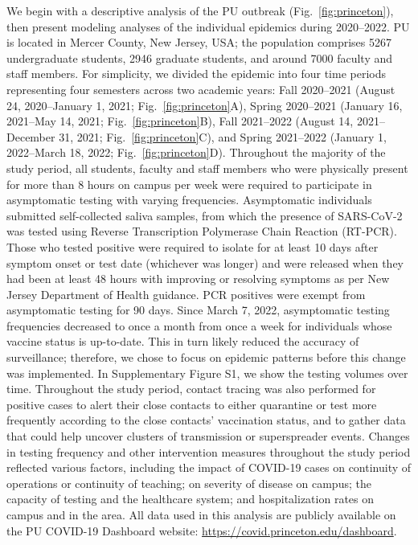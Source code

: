 \documentclass[12pt]{article}
\newcommand{\fref}[1]{Fig.~\ref{fig:#1}}
\begin{document}
We begin with a descriptive analysis of the PU outbreak (\fref{princeton}), then present modeling analyses of the individual epidemics during 2020--2022.
PU is located in Mercer County, New Jersey, USA;
the population comprises 5267 undergraduate students, 2946 graduate students, and around 7000 faculty and staff members.
For simplicity, we divided the epidemic into four time periods representing four semesters across two academic years: Fall 2020--2021 (August 24, 2020--January 1, 2021; \fref{princeton}A), Spring 2020--2021 (January 16, 2021--May 14, 2021; \fref{princeton}B), Fall 2021--2022 (August 14, 2021--December 31, 2021; \fref{princeton}C), and Spring 2021--2022 (January 1, 2022--March 18, 2022; \fref{princeton}D).
Throughout the majority of the study period, all students, faculty and staff members who were physically present for more than 8 hours on campus per week were required to participate in asymptomatic testing with varying frequencies.
Asymptomatic individuals submitted self-collected saliva samples, from which the presence of SARS-CoV-2 was tested using Reverse Transcription Polymerase Chain Reaction (RT-PCR).  
Those who tested positive were required to isolate for at least 10 days after symptom onset or test date (whichever was longer) and were released when they had been at least 48 hours with improving or resolving symptoms as per New Jersey Department of Health guidance.
PCR positives were exempt from asymptomatic testing for 90 days.
Since March 7, 2022, asymptomatic testing frequencies decreased to once a month from once a week for individuals whose vaccine status is up-to-date. This in turn likely reduced the accuracy of surveillance; therefore, we chose to focus on epidemic patterns before this change was implemented.
In Supplementary Figure S1, we show the testing volumes over time.
Throughout the study period, contact tracing was also performed for positive cases to alert their close contacts to either quarantine or test more frequently according to the close contacts' vaccination status, and to gather data that could help uncover clusters of transmission or superspreader events.
Changes in testing frequency and other intervention measures throughout the study period reflected various factors, including the impact of COVID-19 cases on continuity of operations or continuity of teaching; on severity of disease on campus; the capacity of testing and the healthcare system; and hospitalization rates on campus and in the area.
All data used in this analysis are publicly available on the PU COVID-19 Dashboard website: \url{https://covid.princeton.edu/dashboard}.
\end{document}
